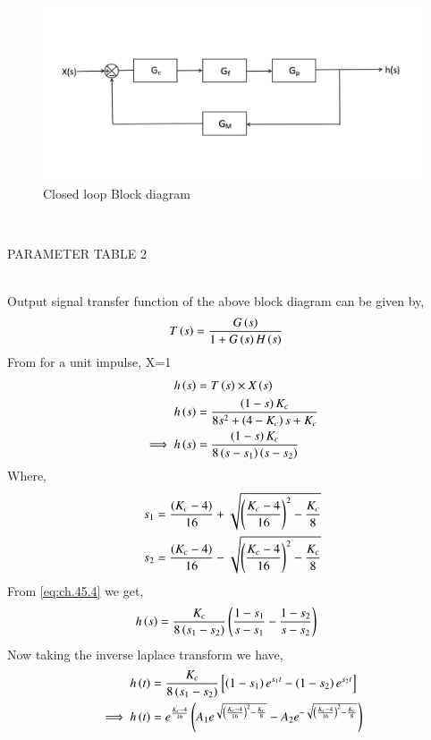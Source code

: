 \documentclass[journal,12pt,twocolumn]{IEEEtran}
\theoremstyle{remark}
\begin{document}
\begin{figure}[ht]
    \centering
    \includegraphics[width=\columnwidth]{figs/a.png}
    \caption{Closed loop Block diagram}
    \label{fig:ch.45.2}
\end{figure}    \\
\begin{table}[ht]
    \centering
    
    \caption{PARAMETER TABLE 2}
    \label{tab:ch.45.2}
\end{table} \\
Output signal transfer function of the above block diagram can be given by,
\begin{align}
     T\left(s\right) &= \frac{G\left(s\right)}{1+G\left(s\right)H\left(s\right)}    
\end{align}
From 
for a unit impulse, X=1 \\
\begin{align}
    h\left(s\right) &= T\left(s\right)\times X\left(s\right)   \\
    h\left(s\right) &= \frac{\left(1-s\right)K_c}{8s^2 + \left(4-K_c\right)s + K_c}  \\
    \implies h\left(s\right) &= \frac{\left(1-s\right)K_c}{8\left(s-s_1\right)\left(s-s_2\right)}  \label{eq:ch.45.4}
\end{align}
Where,
\begin{align}
    s_1 &= \frac{\left(K_c-4\right)}{16} + \sqrt{\left(\frac{K_c-4}{16}\right)^2 - \frac{K_c}{8}}  \\
    s_2 &= \frac{\left(K_c-4\right)}{16} - \sqrt{\left(\frac{K_c-4}{16}\right)^2 - \frac{K_c}{8}} 
\end{align}
From \eqref{eq:ch.45.4} we get,
\begin{align}
    h\left(s\right) &= \frac{K_c}{8\left(s_1-s_2\right)}\left(\frac{1-s_1}{s-s_1}-\frac{1-s_2}{s-s_2}\right)
\end{align}
Now taking the inverse laplace transform we have,
\begin{align}
    h\left(t\right) &= \frac{K_c}{8\left(s_1-s_2\right)} \left [\left(1-s_1\right)e^{s_1t}-\left(1-s_2\right)e^{s_2t} \right ]  \\
    \implies h\left(t\right) &= e^{\frac{K_c-4}{16}}\left(A_1e^{\sqrt{\left(\frac{K_c-4}{16}\right)^2 - \frac{K_c}{8}}} - A_2e^{-\sqrt{\left(\frac{K_c-4}{16}\right)^2 - \frac{K_c}{8}}}\right)    
\end{align}
\end{document}

